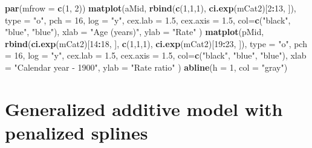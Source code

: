 \documentclass[
]{book}
\newenvironment{Shaded}{\begin{snugshade}}{\end{snugshade}}
\newcommand{\AttributeTok}[1]{\textcolor[rgb]{0.13,0.29,0.53}{#1}}
\newcommand{\DecValTok}[1]{\textcolor[rgb]{0.00,0.00,0.81}{#1}}
\newcommand{\FloatTok}[1]{\textcolor[rgb]{0.00,0.00,0.81}{#1}}
\newcommand{\FunctionTok}[1]{\textcolor[rgb]{0.13,0.29,0.53}{\textbf{#1}}}
\newcommand{\NormalTok}[1]{#1}
\newcommand{\SpecialCharTok}[1]{\textcolor[rgb]{0.81,0.36,0.00}{\textbf{#1}}}
\newcommand{\StringTok}[1]{\textcolor[rgb]{0.31,0.60,0.02}{#1}}
\begin{document}
\begin{Shaded}
\begin{Highlighting}[]
\FunctionTok{par}\NormalTok{(}\AttributeTok{mfrow =} \FunctionTok{c}\NormalTok{(}\DecValTok{1}\NormalTok{, }\DecValTok{2}\NormalTok{))}
\FunctionTok{matplot}\NormalTok{(aMid, }\FunctionTok{rbind}\NormalTok{(}\FunctionTok{c}\NormalTok{(}\DecValTok{1}\NormalTok{,}\DecValTok{1}\NormalTok{,}\DecValTok{1}\NormalTok{), }\FunctionTok{ci.exp}\NormalTok{(mCat2)[}\DecValTok{2}\SpecialCharTok{:}\DecValTok{13}\NormalTok{, ]), }\AttributeTok{type =} \StringTok{"o"}\NormalTok{, }\AttributeTok{pch =} \DecValTok{16}\NormalTok{,     }
   \AttributeTok{log =} \StringTok{"y"}\NormalTok{, }\AttributeTok{cex.lab =} \FloatTok{1.5}\NormalTok{, }\AttributeTok{cex.axis =} \FloatTok{1.5}\NormalTok{, }\AttributeTok{col=}\FunctionTok{c}\NormalTok{(}\StringTok{"black"}\NormalTok{, }\StringTok{"blue"}\NormalTok{, }\StringTok{"blue"}\NormalTok{),}
  \AttributeTok{xlab =} \StringTok{"Age (years)"}\NormalTok{, }\AttributeTok{ylab =} \StringTok{"Rate"}\NormalTok{ )}
\FunctionTok{matplot}\NormalTok{(pMid, }\FunctionTok{rbind}\NormalTok{(}\FunctionTok{ci.exp}\NormalTok{(mCat2)[}\DecValTok{14}\SpecialCharTok{:}\DecValTok{18}\NormalTok{, ], }\FunctionTok{c}\NormalTok{(}\DecValTok{1}\NormalTok{,}\DecValTok{1}\NormalTok{,}\DecValTok{1}\NormalTok{), }\FunctionTok{ci.exp}\NormalTok{(mCat2)[}\DecValTok{19}\SpecialCharTok{:}\DecValTok{23}\NormalTok{, ]),}
        \AttributeTok{type =} \StringTok{"o"}\NormalTok{, }\AttributeTok{pch =} \DecValTok{16}\NormalTok{, }\AttributeTok{log =} \StringTok{"y"}\NormalTok{, }\AttributeTok{cex.lab =} \FloatTok{1.5}\NormalTok{, }\AttributeTok{cex.axis =} \FloatTok{1.5}\NormalTok{,}
        \AttributeTok{col=}\FunctionTok{c}\NormalTok{(}\StringTok{"black"}\NormalTok{, }\StringTok{"blue"}\NormalTok{, }\StringTok{"blue"}\NormalTok{),}
  \AttributeTok{xlab =} \StringTok{"Calendar year {-} 1900"}\NormalTok{, }\AttributeTok{ylab =} \StringTok{"Rate ratio"}\NormalTok{ )}
\FunctionTok{abline}\NormalTok{(}\AttributeTok{h =} \DecValTok{1}\NormalTok{, }\AttributeTok{col =} \StringTok{"gray"}\NormalTok{)}
\end{Highlighting}
\end{Shaded}

\section{Generalized additive model with penalized splines}\label{generalized-additive-model-with-penalized-splines}
\end{document}
